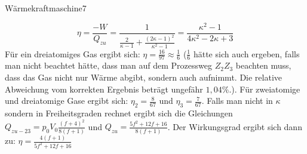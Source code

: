 \begin{problem}{Wärmekraftmaschine}{7}
\begin{solution}
$$\eta=\frac{-W}{Q_{zu}}=\frac 1{\frac 2{\kappa - 1}+\frac{(2\kappa-1)^2}{\kappa^2-1}}=\frac{\kappa^2-1}{4\kappa^2-2\kappa+3}$$
Für ein dreiatomiges Gas ergibt sich: $\eta=\frac {16}{97}\approx \frac 16$ ($\frac 16$ hätte sich auch ergeben, falls man nicht beachtet hätte, dass man auf dem Prozessweg $Z_2Z_3$ beachten muss, dass das Gas nicht nur Wärme abgibt, sondern auch aufnimmt. Die relative Abweichung vom korrekten Ergebnis beträgt ungefähr $1,04\%$.).
Für zweiatomige und dreiatomige Gase ergibt sich: $\eta_2=\frac 8{67}$ und $\eta_3=\frac 7{67}$.
Falls man nicht in $\kappa$ sondern in Freiheitsgraden rechnet ergibt sich die Gleichungen $Q_{zu-23}=p_0V_0\frac{(f+4)^2}{8(f+1)}$ und $Q_{zu}=\frac{5f^2+12f+16}{8(f+1)}$. Der Wirkungsgrad ergibt sich dann zu: $\eta=\frac{4(f+1)}{5f^2+12f+16}$

\end{solution}
\end{problem}

